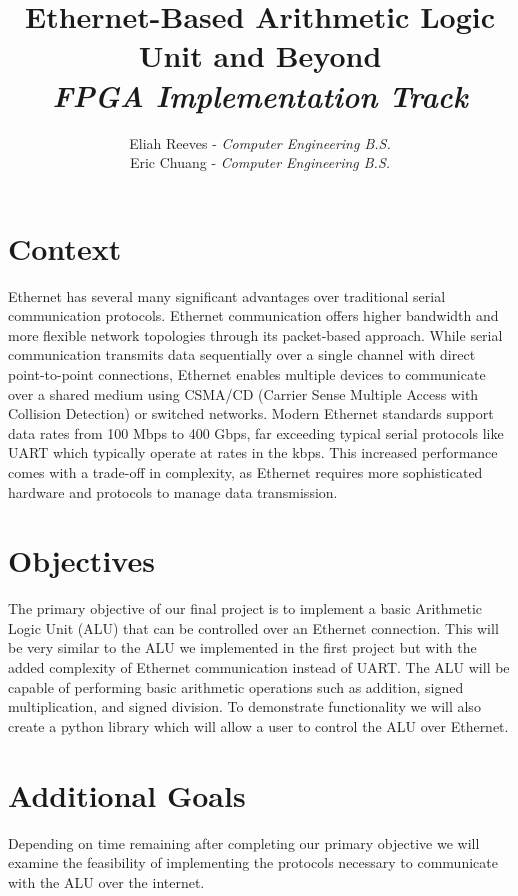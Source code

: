 \documentclass{article}
\title{Ethernet-Based Arithmetic Logic Unit and Beyond\\
        \Large \emph{FPGA Implementation Track}}
\author{{Eliah Reeves} - \emph{Computer Engineering B.S.}\\ {Eric Chuang} - \emph{Computer Engineering B.S.}}
\date{\vspace{-5ex}} %
\begin{document}
\maketitle
\thispagestyle{firstpage}
\section*{Context}

Ethernet has several many significant advantages over traditional serial communication protocols. Ethernet communication offers higher bandwidth and more flexible network topologies through its packet-based approach. While serial communication transmits data sequentially over a single channel with direct point-to-point connections, Ethernet enables multiple devices to communicate over a shared medium using CSMA/CD (Carrier Sense Multiple Access with Collision Detection) or switched networks. Modern Ethernet standards support data rates from 100 Mbps to 400 Gbps, far exceeding typical serial protocols like UART which typically operate at rates in the kbps. This increased performance comes with a trade-off in complexity, as Ethernet requires more sophisticated hardware and protocols to manage data transmission.

\section*{Objectives}

The primary objective of our final project is to implement a basic Arithmetic Logic Unit (ALU) that can be controlled over an Ethernet connection. This will be very similar to the ALU we implemented in the first project but with the added complexity of Ethernet communication instead of UART. The ALU will be capable of performing basic arithmetic operations such as addition, signed multiplication, and signed division. To demonstrate functionality we will also create a python library which will allow a user to control the ALU over Ethernet.

\section*{Additional Goals}

Depending on time remaining after completing our primary objective we will examine the feasibility of implementing the protocols necessary to communicate with the ALU over the internet.
\end{document}

